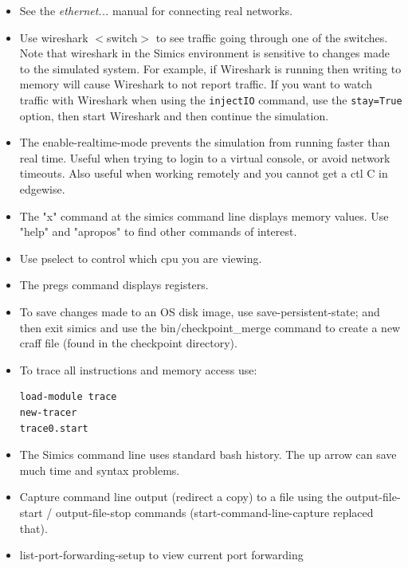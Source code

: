 \documentclass[titlepage]{article}
\begin{document}
\begin{appendices}
\begin{itemize}
\item See the \textit{ethernet...} manual for connecting real networks.

\item Use wireshark $<$switch$>$ to see traffic going through one of the switches. Note that wireshark in the Simics environment is sensitive to 
changes made to the simulated system.  For example, if Wireshark is running then writing to memory will cause Wireshark to not report traffic.  
If you want to watch traffic with Wireshark when using the {\tt injectIO} command, use the {\tt stay=True} option, then start Wireshark and then
continue the simulation.

\item The enable-realtime-mode prevents the simulation from running faster than real time.  Useful when trying to login
to a virtual console, or avoid network timeouts.  Also useful when working remotely and you cannot get a ctl C in 
edgewise.

\item The "x" command at the simics command line displays memory values.  Use "help" and "apropos" to find other commands of interest.

\item Use pselect to control which cpu you are viewing.

\item The pregs command displays registers.  

\item To save changes made to an OS disk image, use save-persistent-state; and then exit simics and use the bin/checkpoint\_merge command
to create a new craff file (found in the checkpoint directory).

\item To trace all instructions and memory access use:
\begin{verbatim}
load-module trace
new-tracer
trace0.start
\end{verbatim}

\item The Simics command line uses standard bash history.  The up arrow can save much time and syntax problems.

\item Capture command line output (redirect a copy) to a file using the output-file-start / output-file-stop commands
(start-command-line-capture replaced that).

\item {list-port-forwarding-setup} to view current port forwarding
\end{itemize}


\end{appendices}
\end{document}
